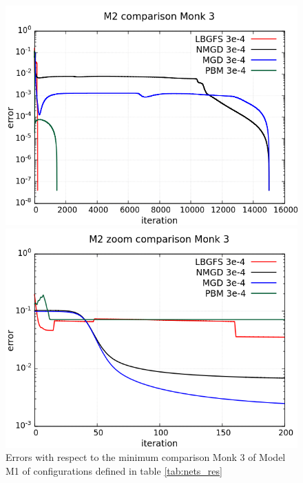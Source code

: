 \begin{figure}[H]
	\centering
	\begin{minipage}[t]{0.5\linewidth}
		\includegraphics[width=\linewidth]{data/Comparison/Monk3/Monk3_M2_error_standard.png}
	\end{minipage}%
	\begin{minipage}[t]{0.5\linewidth}
		\includegraphics[width=\linewidth]{data/Comparison/Monk3/Monk3_M2_error_zoom.png}
	\end{minipage}
	\caption{Errors with respect to the minimum comparison Monk 3 of Model M1 of configurations defined in table \ref{tab:nets_res}}
	\label{R-Monk3-M2}
\end{figure}

